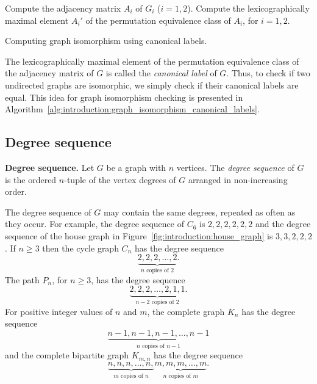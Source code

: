 \begin{algorithm}[!htpb]
\SetLine
\dontprintsemicolon  %
\BlankLine
Compute the adjacency matrix $A_i$ of $G_i$ ($i = 1, 2$).\;
Compute the lexicographically maximal element $A_i'$ of the
permutation equivalence class of $A_i$, for $i = 1, 2$.\;
\caption{Computing graph isomorphism using canonical labels.}
\label{alg:introduction:graph_isomorphism_canonical_labels}
\end{algorithm}

The lexicographically maximal element of the permutation equivalence
class of the adjacency matrix of $G$ is called the
\emph{canonical label} of $G$. Thus, to check if two undirected graphs
are isomorphic, we simply check if their canonical labels are equal.
 This idea for graph isomorphism checking
is presented in
Algorithm~\ref{alg:introduction:graph_isomorphism_canonical_labels}.



\subsection{Degree sequence}

\begin{definition}
\textbf{Degree sequence.}
Let $G$ be a graph with $n$ vertices. The \emph{degree sequence} of
$G$ is the ordered $n$-tuple of the vertex degrees of $G$ arranged in
non-increasing order.
\end{definition}

The degree sequence of $G$ may contain the same degrees, repeated as
often as they occur. For example, the degree sequence of $C_6$ is
$2, 2, 2, 2, 2, 2$ and the degree sequence of the house graph in
Figure~\ref{fig:introduction:house_graph} is $3, 3, 2, 2, 2$. If
$n \geq 3$ then the cycle graph $C_n$ has the degree sequence
\[
\underbrace{2, 2, 2, \dots, 2}_{n \text{ copies of } 2}.
\]
The path $P_n$, for $n \geq 3$, has the degree sequence
\[
\underbrace{2, 2, 2, \dots, 2, 1, 1}_{n - 2 \text{ copies of } 2}.
\]
For positive integer values of $n$ and $m$, the complete graph $K_n$
has the degree sequence
\[
\underbrace{n-1, n-1, n-1, \dots, n-1}_{n \text{ copies of } n-1}
\]
and the complete bipartite graph $K_{m,n}$ has the degree sequence
\[
\underbrace{n, n, n, \dots, n,}_{m \text{ copies of } n}
\underbrace{m, m, m, \dots, m}_{n \text{ copies of } m}.
\]

